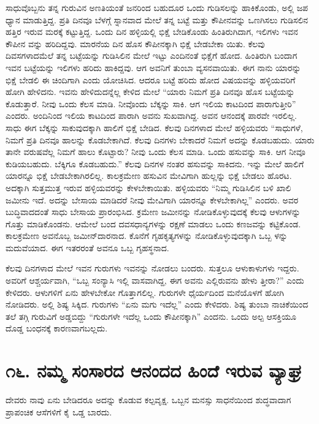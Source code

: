 ಸಾಧುವೊಬ್ಬನು ತನ್ನ ಗುರುವಿನ ಅಣತಿಯಂತೆ ಜನರಿಂದ ಬಹುದೂರ ಒಂದು ಗುಡಿಸಲನ್ನು ಹಾಕಿಕೊಂಡು, ಅಲ್ಲಿ ಜಪ ಧ್ಯಾನ ಮಾಡುತ್ತಿದ್ದ. ಪ್ರತಿ ದಿನವೂ ಬೆಳಗ್ಗೆ ಸ್ನಾನವಾದ ಮೇಲೆ ತನ್ನ ಬಟ್ಟೆ ಮತ್ತು ಕೌಪೀನವನ್ನು ಒಣಗಿಸಲು ಗುಡಿಸಲಿನ ಹತ್ತಿರ ಇರುವ ಮರಕ್ಕೆ ಕಟ್ಟುತ್ತಿದ್ದ. ಒಂದು ದಿನ ಹಳ್ಳಿಯಲ್ಲಿ ಭಿಕ್ಷೆ ಬೇಡಿಕೊಂಡು ಹಿಂತಿರುಗಿದಾಗ, ಇಲಿಗಳು ಇವನ ಕೌಪೀನ ವನ್ನು ಹರಿದಿದ್ದವು. ಮಾರನೆಯ ದಿನ ಹೊಸ ಕೌಪೀನಕ್ಕಾಗಿ ಭಿಕ್ಷೆ ಬೇಡಬೇಕಾ ಯಿತು. ಕೆಲವು ದಿವಸಗಳಾದಮೆಲೆ ತನ್ನ ಬಟ್ಟೆಯನ್ನು ಗುಡಿಸಿಲಿನ ಮೇಲೆ ಇಟ್ಟು ಎಂದಿನಂತೆ ಭಿಕ್ಷೆಗೆ ಹೋದ. ಹಿಂತಿರುಗಿ ಬಂದಾಗ ಇವನ ಬಟ್ಟೆಯನ್ನು ಇಲಿಗಳು ಹರಿದು ಹಾಕಿದ್ದವು. ಆಗ ಅವನಿಗೆ ತುಂಬಾ ವ್ಯಸನವಾಯಿತು. ಈಗ ನಾನು ಯಾರನ್ನು ಭಿಕ್ಷೆ ಬೇಡಲಿ ಈ ಚಿಂದಿಗಾಗಿ ಎಂದು ಯೋಚಿಸಿದ. ಆದರೂ ಬಟ್ಟೆ ಹರಿದು ಹೋದ ವಿಷಯವನ್ನು ಹಳ್ಳಿಯವರಿಗೆ ಹೋಗಿ ಹೇಳಿದನು. ಇವನು ಹೇಳಿದುದನ್ನೆಲ್ಲ ಕೇಳಿದ ಮೇಲೆ “ಯಾರು ನಿಮಗೆ ಪ್ರತಿ ದಿನವೂ ಹೊಸ ಬಟ್ಟೆಯನ್ನು ಕೊಡುತ್ತಾರೆ. ನೀವು ಒಂದು ಕೆಲಸ ಮಾಡಿ. ನೀವೊಂದು ಬೆಕ್ಕನ್ನು ಸಾಕಿ. ಆಗ ಇಲಿಯ ಕಾಟದಿಂದ ಪಾರಾಗುತ್ತೀರಿ” ಎಂದರು. ಅಂದಿನಿಂದ ಇಲಿಯ ಕಾಟದಿಂದ ಪಾರಾಗಿ ಅವನು ಸುಖವಾಗಿದ್ದ. ಅವನ ಆನಂದಕ್ಕೆ ಪಾರವೇ ಇರಲಿಲ್ಲ. ಸಾಧು ಈಗ ಬೆಕ್ಕನ್ನು ಸಾಕುವುದಕ್ಕಾಗಿ ಹಾಲಿಗೆ ಭಿಕ್ಷೆ ಬೇಡಿದ. ಕೆಲವು ದಿನಗಳಾದ ಮೇಲೆ ಹಳ್ಳಿಯವರು “ಸಾಧುಗಳೆ, ನಿಮಗೆ ಪ್ರತಿ ದಿನವೂ ಹಾಲನ್ನು ಕೊಡಬೇಕಾಗಿದೆ. ಕೆಲವು ದಿನಗಳು ಬೇಕಾದರೆ ನಿಮಗೆ ಅದನ್ನು ಕೊಡಬಹುದು. ಯಾರು ತಾನೇ ವರುಷವೆಲ್ಲ ನಿಮಗೆ ಹಾಲು ಕೊಟ್ಟಾರು? ನೀವು ಒಂದು ಕೆಲಸ ಮಾಡಿ. ಒಂದು ಹಸುವನ್ನು ಸಾಕಿ. ಆಗ ನೀವೂ ಕುಡಿಯಬಹುದು. ಬೆಕ್ಕಿಗೂ ಕೊಡಬಹುದು.” ಕೆಲವು ದಿನಗಳ ನಂತರ ಹಸುವನ್ನು ಸಾಕಿದನು. ಇನ್ನು ಮೇಲೆ ಹಾಲಿಗೆ ಯಾರನ್ನೂ ಭಿಕ್ಷೆ ಬೇಡಬೇಕಾಗಿರಲಿಲ್ಲ. ಕಾಲಕ್ರಮೇಣ ಹಸುವಿನ ಮೇವಿಗಾಗಿ ಹುಲ್ಲನ್ನು ಭಿಕ್ಷೆ ಬೇಡಲು ಹೊರಟ. ಅದಕ್ಕಾಗಿ ಸುತ್ತಮುತ್ತ ಇರುವ ಹಳ್ಳಿಯವರನ್ನು ಕೇಳಬೇಕಾಯಿತು. ಹಳ್ಳಿಯವರು “ನಿಮ್ಮ ಗುಡಿಸಿಲಿನ ಬಳಿ ಖಾಲಿ ಜಮೀನು ಇದೆ. ಅದನ್ನು ಬೇಸಾಯ ಮಾಡಿದರೆ ನೀವು ಮೇವಿಗಾಗಿ ಯಾರನ್ನೂ ಕೇಳಬೇಕಾಗಿಲ್ಲ” ಎಂದರು. ಅವರ ಬುದ್ಧಿವಾದದಂತೆ ಸಾಧು ಬೇಸಾಯ ಪ್ರಾರಂಭಿಸಿದ. ಕ್ರಮೇಣ ಜಮೀನನ್ನು ನೋಡಿಕೊಳ್ಳುವುದಕ್ಕೆ ಕೆಲವು ಆಳುಗಳನ್ನು ಗೊತ್ತು ಮಾಡಿಕೊಂಡನು. ಆಮೇಲೆ ಬಂದ ದವಸಧಾನ್ಯಗಳನ್ನು ರಕ್ಷಣೆ ಮಾಡಲು ಒಂದು ಕಣಜವನ್ನು ಕಟ್ಟಿಕೊಂಡ. ಕಾಲಕ್ರಮೇಣ ಅವನೊಬ್ಬ ಜಮೀನ್​ದಾರನಾದ. ಕೊನೆಗೆ ಗೃಹಕೃತ್ಯಗಳನ್ನು ನೋಡಿಕೊಳ್ಳುವುದಕ್ಕಾಗಿ ಒಬ್ಬ ಳನ್ನು ಮದುವೆಯಾದ. ಈಗ ಇತರರಂತೆ ಅವನೂ ಒಬ್ಬ ಗೃಹಸ್ಥನಾದ.

ಕೆಲವು ದಿನಗಳಾದ ಮೇಲೆ ಇವನ ಗುರುಗಳು ಇವನನ್ನು ನೋಡಲು ಬಂದರು. ಸುತ್ತಲೂ ಆಳುಕಾಳುಗಳು ಇದ್ದರು. ಅವರಿಗೆ ಆಶ್ಚರ್ಯವಾಗಿ, “ಒಬ್ಬ ಸಂನ್ಯಾಸಿ ಇಲ್ಲಿ ವಾಸವಾಗಿದ್ದ, ಈಗ ಅವನು ಎಲ್ಲಿರುವನು ಹೇಳು ತ್ತೀರಾ?” ಎಂದು ಕೇಳಿದರು. ಆಳುಗಳಿಗೆ ಏನು ಹೇಳಬೇಕೋ ಗೊತ್ತಾಗಲಿಲ್ಲ. ಗುರುಗಳೇ ಧೈರ್ಯದಿಂದ ಮನೆಯೊಳಗೆ ಹೋಗಿ ನೋಡಿದರು. ಅಲ್ಲಿ ಶಿಷ್ಯ ಸಿಕ್ಕಿದ. ಗುರುಗಳು “ಏನು ಮಗು ಇದೆಲ್ಲ” ಎಂದು ಕೇಳಿದರು. ಶಿಷ್ಯ ತುಂಬಾ ನಾಚಿಕೆಯಿಂದ ತಲೆ ತಗ್ಗಿ ಗುರುವಿಗೆ ಅಡ್ಡಬಿದ್ದು “ಗುರುಗಳೇ ಇದೆಲ್ಲ ಒಂದು ಕೌಪೀನಕ್ಕಾಗಿ” ಎಂದನು. ಒಂದು ಅಲ್ಪ ಆಸಕ್ತಿಯೂ ದೊಡ್ಡ ಬಂಧನಕ್ಕೆ ಕಾರಣವಾಗಬಲ್ಲದು.


\section{\num{೧೬.} ನಮ್ಮ ಸಂಸಾರದ ಆನಂದದ ಹಿಂದೆ ಇರುವ ವ್ಯಾಘ್ರ}

ದೇವರು ನಾವು ಏನು ಬೇಡಿದರೂ ಅದನ್ನು ಕೊಡುವ ಕಲ್ಪವೃಕ್ಷ. ಒಬ್ಬನ ಮನಸ್ಸು ಸಾಧನೆಯಿಂದ ಶುದ್ಧವಾದಾಗ ಪ್ರಾಪಂಚಿಕ ಆಸೆಗಳಿಗೆ ಕೈ ಒಡ್ಡ ಬಾರದು.

